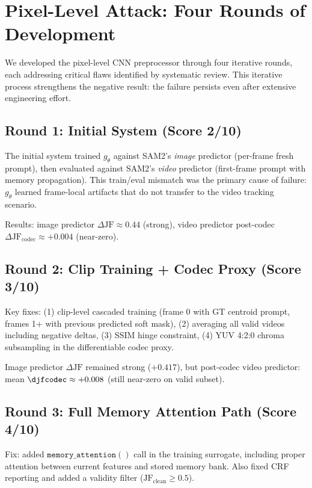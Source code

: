 \section{Pixel-Level Attack: Four Rounds of Development}
\label{sec:pixel_exps}

We developed the pixel-level CNN preprocessor through four iterative rounds, each addressing critical flaws identified by systematic review. This iterative process strengthens the negative result: the failure persists even after extensive engineering effort.

\subsection{Round 1: Initial System (Score 2/10)}
The initial system trained $g_\theta$ against SAM2's \emph{image} predictor (per-frame fresh prompt), then evaluated against SAM2's \emph{video} predictor (first-frame prompt with memory propagation). This train/eval mismatch was the primary cause of failure: $g_\theta$ learned frame-local artifacts that do not transfer to the video tracking scenario.

Results: image predictor $\Delta\text{JF} \approx 0.44$ (strong), video predictor post-codec $\Delta\text{JF}_\text{codec} \approx +0.004$ (near-zero).

\subsection{Round 2: Clip Training + Codec Proxy (Score 3/10)}
Key fixes: (1) clip-level cascaded training (frame 0 with GT centroid prompt, frames 1+ with previous predicted soft mask), (2) averaging all valid videos including negative deltas, (3) SSIM hinge constraint, (4) YUV 4:2:0 chroma subsampling in the differentiable codec proxy.

Image predictor $\Delta\text{JF}$ remained strong ($+0.417$), but post-codec video predictor: mean $\djfcodec \approx +0.008$ (still near-zero on valid subset).

\subsection{Round 3: Full Memory Attention Path (Score 4/10)}
Fix: added $\texttt{memory\_attention}()$ call in the training surrogate, including proper attention between current features and stored memory bank. Also fixed CRF reporting and added a validity filter ($\text{JF}_\text{clean} \geq 0.5$).

